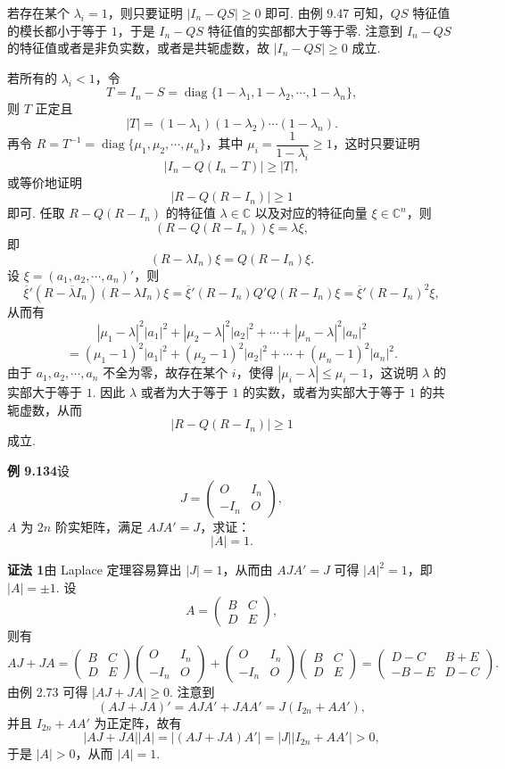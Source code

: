 \documentclass[UTF8, 12pt, fontset=fandol, oneside]{ctexart}
\begin{document}
若存在某个 $\lambda_i=1$，则只要证明 $|I_n-QS|\ge0$ 即可. 由例 9.47 可知，$QS$ 特征值的模长都小于等于 $1$，于是 $I_n-QS$ 特征值的实部都大于等于零. 注意到 $I_n-QS$ 的特征值或者是非负实数，或者是共轭虚数，故 $|I_n-QS|\ge0$ 成立.

若所有的 $\lambda_i<1$，令
\[
T=I_n-S=\operatorname{diag}\{1-\lambda_1,1-\lambda_2,\cdots,1-\lambda_n\},
\]
则 $T$ 正定且
\[
|T|=(1-\lambda_1)(1-\lambda_2)\cdots(1-\lambda_n).
\]
再令 $R=T^{-1}=\operatorname{diag}\{\mu_1,\mu_2,\cdots,\mu_n\}$，其中 $\mu_i=\dfrac{1}{1-\lambda_i}\ge1$，这时只要证明
\[
|I_n-Q(I_n-T)|\ge |T|,
\]
或等价地证明
\[
|R-Q(R-I_n)|\ge1
\]
即可. 任取 $R-Q(R-I_n)$ 的特征值 $\lambda\in\mathbb{C}$ 以及对应的特征向量 $\xi\in\mathbb{C}^n$，则
\[
(R-Q(R-I_n))\xi=\lambda\xi,
\]
即
\[
(R-\lambda I_n)\xi=Q(R-I_n)\xi.
\]
设 $\xi=(a_1,a_2,\cdots,a_n)'$，则
\[
\overline{\xi}'(R-\overline{\lambda}I_n)(R-\lambda I_n)\xi
=\overline{\xi}'(R-I_n)Q'Q(R-I_n)\xi
=\overline{\xi}'(R-I_n)^2\xi,
\]
从而有
\[
|\mu_1-\lambda|^2|a_1|^2+|\mu_2-\lambda|^2|a_2|^2+\cdots+|\mu_n-\lambda|^2|a_n|^2
\]
\[
=(\mu_1-1)^2|a_1|^2+(\mu_2-1)^2|a_2|^2+\cdots+(\mu_n-1)^2|a_n|^2.
\]
由于 $a_1,a_2,\cdots,a_n$ 不全为零，故存在某个 $i$，使得 $|\mu_i-\lambda|\le\mu_i-1$，这说明 $\lambda$ 的实部大于等于 $1$. 因此 $\lambda$ 或者为大于等于 $1$ 的实数，或者为实部大于等于 $1$ 的共轭虚数，从而
\[
|R-Q(R-I_n)|\ge1
\]
成立.

\noindent\textbf{例 9.134}\quad 设
\[
J=\begin{pmatrix}
O&I_n\\
-I_n&O
\end{pmatrix},
\]
$A$ 为 $2n$ 阶实矩阵，满足 $AJA'=J$，求证：
\[
|A|=1.
\]

\noindent\textbf{证法 1}\quad 由 Laplace 定理容易算出 $|J|=1$，从而由 $AJA'=J$ 可得 $|A|^2=1$，即 $|A|=\pm1$. 设
\[
A=\begin{pmatrix}
B&C\\
D&E
\end{pmatrix},
\]
则有
\[
AJ+JA=\begin{pmatrix}
B&C\\
D&E
\end{pmatrix}
\begin{pmatrix}
O&I_n\\
-I_n&O
\end{pmatrix}
+
\begin{pmatrix}
O&I_n\\
-I_n&O
\end{pmatrix}
\begin{pmatrix}
B&C\\
D&E
\end{pmatrix}
=\begin{pmatrix}
D-C&B+E\\
-B-E&D-C
\end{pmatrix}.
\]
由例 2.73 可得 $|AJ+JA|\ge0$. 注意到
\[
(AJ+JA)'=AJA'+JA A'=J(I_{2n}+AA'),
\]
并且 $I_{2n}+AA'$ 为正定阵，故有
\[
|AJ+JA||A|=|(AJ+JA)A'|=|J||I_{2n}+AA'|>0,
\]
于是 $|A|>0$，从而 $|A|=1$.
\end{document}

